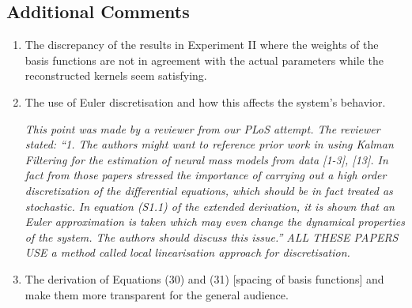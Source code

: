 \documentclass{article}
\begin{document}
    \subsection{Additional Comments}
    
    \begin{enumerate}
        \item The discrepancy of the results in Experiment II where the weights of the basis functions are not in agreement with the actual parameters while the reconstructed kernels seem satisfying.

        \item The use of Euler discretisation and how this affects the system's behavior.

		\emph{This point was made by a reviewer from our PLoS attempt. The reviewer stated: ``1. The authors might want to reference prior work in using Kalman
		Filtering for the estimation of neural mass models from data [1-3],
		[13]. In fact from those papers stressed the importance of carrying out
		a high order discretization of the differential equations, which should
		be in fact treated as stochastic. In equation (S1.1) of the extended
		derivation, it is shown that an Euler approximation is taken which may
		even change the dynamical properties of the system. The authors should
		discuss this issue.'' ALL THESE PAPERS USE a method called local linearisation approach for discretisation.}
		
        \item The derivation of Equations (30) and (31) [spacing of basis functions] and make them more transparent for the general audience.


\end{enumerate}
\end{document}
